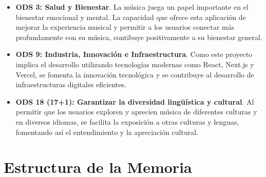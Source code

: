 \begin{itemize}
    \item \textbf{ODS 3: Salud y Bienestar}. La música juega un papel importante en el bienestar emocional y mental. La capacidad que ofrece esta aplicación de mejorar la experiencia musical y permitir a los usuarios conectar más profundamente con su música, contibuye positivamente a su bienestar general.
    \item \textbf{ODS 9: Industria, Innovación e Infraestructura}. Como este proyecto implica el desarrollo utilizando tecnologías modernas como React, Next.js y Vercel, se fomenta la innovación tecnológica y se contribuye al desarrollo de infraestructuras digitales eficientes.
    \item \textbf{ODS 18 (17+1): Garantizar la diversidad lingüística y cultural}. Al permitir que los usuarios exploren y aprecien música de diferentes culturas y en diversos idiomas, se facilita la exposición a otras culturas y lenguas, fomentando así el entendimiento y la apreciación cultural.
\end{itemize}

\section{Estructura de la Memoria}
\cite{Shahbaba2011}
